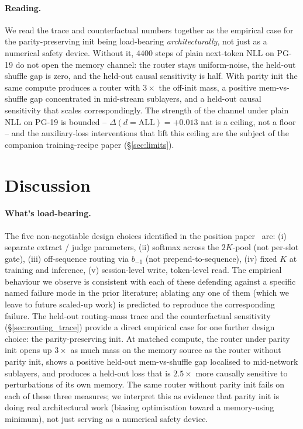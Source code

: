 \documentclass{article}
\begin{document}
\paragraph{Reading.}
We read the trace and counterfactual numbers together as the
empirical case for the parity-preserving init being load-bearing
\emph{architecturally}, not just as a numerical safety device.
Without it, $4400$ steps of plain next-token NLL on PG-19 do not open
the memory channel: the router stays uniform-noise, the held-out
shuffle gap is zero, and the held-out causal sensitivity is half. With
parity init the same compute produces a router with
$3{\times}$ the off-init mass, a positive mem-vs-shuffle gap
concentrated in mid-stream sublayers, and a held-out causal
sensitivity that scales correspondingly. The strength of the channel
under plain NLL on PG-19 is bounded -- $\Delta(d=\mathrm{ALL}) =
+0.013$ nat is a ceiling, not a floor -- and the auxiliary-loss
interventions that lift this ceiling are the subject of the companion
training-recipe paper (\S\ref{sec:limits}).

\section{Discussion}
\label{sec:discussion}

\paragraph{What's load-bearing.}
The five non-negotiable design choices identified in the position
paper~\cite{liu2025memres} are: (i) separate extract / judge
parameters, (ii) softmax across the $2K$-pool (not per-slot gate),
(iii) off-sequence routing via $b_{-1}$ (not prepend-to-sequence),
(iv) fixed $K$ at training and inference, (v) session-level write,
token-level read. The empirical behaviour we observe is consistent
with each of these defending against a specific named failure mode
in the prior literature; ablating any one of them (which we leave to
future scaled-up work) is predicted to reproduce the corresponding
failure. The held-out routing-mass trace and the counterfactual
sensitivity (\S\ref{sec:routing_trace}) provide a direct empirical
case for one further design choice: the parity-preserving init. At
matched compute, the router under parity init opens up $3\times$ as
much mass on the memory source as the router without parity init,
shows a positive held-out mem-vs-shuffle gap localised to mid-network
sublayers, and produces a held-out loss that is $2.5\times$ more
causally sensitive to perturbations of its own memory. The same router
without parity init fails on each of these three measures; we
interpret this as evidence that parity init is doing real architectural
work (biasing optimisation toward a memory-using minimum), not just
serving as a numerical safety device.
\end{document}
